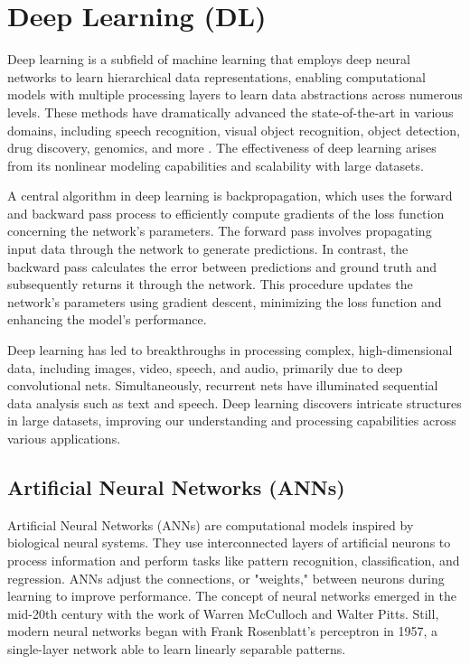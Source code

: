 \section{Deep Learning (DL)}


Deep learning is a subfield of machine learning that employs deep neural networks to learn hierarchical data representations, enabling computational models with multiple processing layers to learn data abstractions across numerous levels. These methods have dramatically advanced the state-of-the-art in various domains, including speech recognition, visual object recognition, object detection, drug discovery, genomics, and more \cite{LeCun2015DeepLearning}. The effectiveness of deep learning arises from its nonlinear modeling capabilities and scalability with large datasets.

A central algorithm in deep learning is backpropagation, which uses the forward and backward pass process to efficiently compute gradients of the loss function concerning the network's parameters. The forward pass involves propagating input data through the network to generate predictions. In contrast, the backward pass calculates the error between predictions and ground truth and subsequently returns it through the network. This procedure updates the network's parameters using gradient descent, minimizing the loss function and enhancing the model's performance.

Deep learning has led to breakthroughs in processing complex, high-dimensional data, including images, video, speech, and audio, primarily due to deep convolutional nets. Simultaneously, recurrent nets have illuminated sequential data analysis such as text and speech. Deep learning discovers intricate structures in large datasets, improving our understanding and processing capabilities across various applications.



\subsection{Artificial Neural Networks (ANNs)}
Artificial Neural Networks (ANNs) are computational models inspired by biological neural systems. They use interconnected layers of artificial neurons to process information and perform tasks like pattern recognition, classification, and regression. ANNs adjust the connections, or "weights," between neurons during learning to improve performance. The concept of neural networks emerged in the mid-20th century with the work of Warren McCulloch and Walter Pitts. Still, modern neural networks began with Frank Rosenblatt's perceptron in 1957, a single-layer network able to learn linearly separable patterns.

